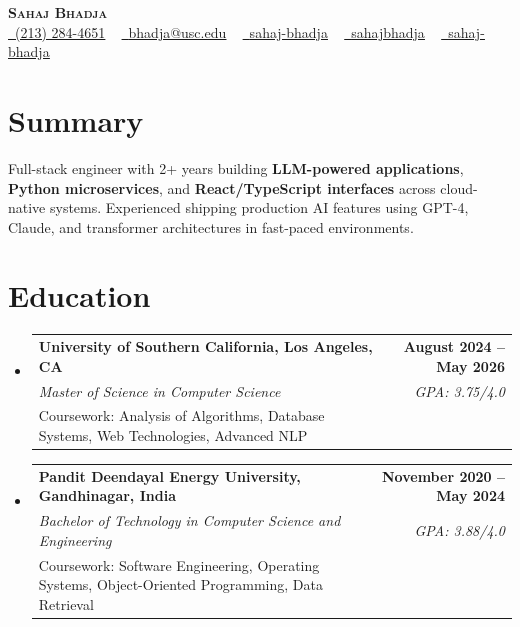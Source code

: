 \documentclass[letterpaper,10pt]{article}
\makeatletter
\newcommand{\resumeEduSubheading}[5]{\vspace{-1pt}\item\begin{tabular*}{1.0\textwidth}[t]{l@{\extracolsep{\fill}}r}\textbf{#1} & \textbf{\small #2} \\\textit{\small #3} & \textit{\small #4} \\\small #5 & \\\end{tabular*}\vspace{-4pt}}
\newcommand{\resumeSubHeadingListStart}{\begin{itemize}[leftmargin=0.0in, label={}]}
\newcommand{\resumeSubHeadingListEnd}{\end{itemize}}
\makeatother
\begin{document}
\begin{center}
{\Huge \scshape \textbf{Sahaj Bhadja}} \\ \vspace{1pt}
\small \href{tel:(213) 284-4651}{\faPhone\ \underline{(213) 284-4651}} ~ \href{mailto:bhadja@usc.edu}{\raisebox{-0.2\height}\faEnvelope\ \underline{bhadja@usc.edu}} ~
\href{https://www.linkedin.com/in/sahaj-bhadja/}{\raisebox{-0.2\height}\faLinkedin\ \underline{sahaj-bhadja}} ~ \href{https://github.com/SAHAJ-BHADJA}{\raisebox{-0.2\height}\faGithub\ \underline{sahajbhadja}} ~
\href{https://sahaj-bhadja.vercel.app/}{\raisebox{-0.2\height}\faGlobe\ \underline{sahaj-bhadja}}
\end{center}
\vspace{-18pt}
\section{Summary}
\begin{itemize}[leftmargin=0.15in, label={}]
\small{\item{Full-stack engineer with 2+ years building \textbf{LLM-powered applications}, \textbf{Python microservices}, and \textbf{React/TypeScript interfaces} across cloud-native systems. Experienced shipping production AI features using GPT-4, Claude, and transformer architectures in fast-paced environments.}}
\end{itemize}
\vspace{-16pt}
\section{Education}
\resumeSubHeadingListStart
\resumeEduSubheading{University of Southern California, Los Angeles, CA}{August 2024 -- May 2026}{Master of Science in Computer Science}{GPA: 3.75/4.0}{Coursework: Analysis of Algorithms, Database Systems, Web Technologies, Advanced NLP}
\vspace{-9pt}
\resumeEduSubheading{Pandit Deendayal Energy University, Gandhinagar, India}{November 2020 -- May 2024}{Bachelor of Technology in Computer Science and Engineering}{GPA: 3.88/4.0}{Coursework: Software Engineering, Operating Systems, Object-Oriented Programming, Data Retrieval}
\resumeSubHeadingListEnd
\vspace{-14pt}
\end{document}
